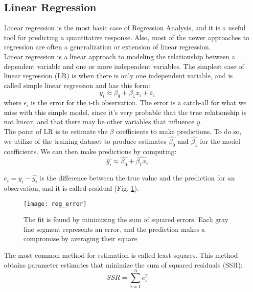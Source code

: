 \subsection{Linear Regression} \label{lin_reg}
Linear regression is the most basic case of Regression Analysis, and it is a useful tool for predicting a quantitative response. Also, most of the newer approaches to regression are often a generalization or extension of linear regression. \\

Linear regression is a linear approach to modeling the relationship between a dependent variable and one or more independent variables. The simplest case of linear regression (LR) is when there is only one independent variable, and is called simple linear regression \cite{wiki:lin_reg} and has this form:
\begin{equation}
	y_i \approx \beta_0 + \beta_1x_i + \varepsilon_i
\end{equation}
where $\epsilon_i$ is the error for the i-th observation. The error is a catch-all for what we miss with this simple model, since it's very probable that the true relationship is not linear, and that there may be other variables that influence $y$. \\

The point of LR is to estimate the $\beta$ coefficients to make predictions. To do so, we utilize of the training dataset to produce estimates $\widehat{\beta_0}$ and $\widehat{\beta_1}$ for the model coefficients. We can then make predictions by computing:
\begin{equation}
\widehat{y_i} \approx \widehat{\beta_0} + \widehat{\beta_1x_i}
\end{equation}

$e_i = y_i - \widehat{y_i}$ is the difference between the true value and the prediction for an observation, and it is called residual (Fig. \ref{fig:reg_error}). \\

\begin{figure}[H]
	\centering
	\texttt{[image: reg\_error]}
	\caption{The fit is found by minimizing the sum of squared errors. Each gray line segment represents an error, and the prediction makes a compromise by averaging their square \cite{ISLR}}
	\label{fig:reg_error}
\end{figure}

The most common method for estimation is called least squares. This method obtains parameter estimates that minimize the sum of squared residuals (SSR):
\begin{equation}
	SSR=\sum _{i=1}^{n}e_{i}^{2}
\end{equation}

